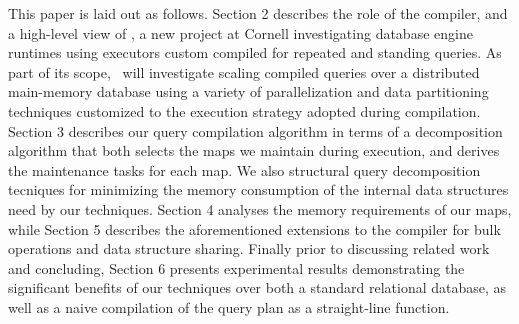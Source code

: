 This paper is laid out as follows. Section 2 describes the role of the compiler,
and a high-level view of \compiler, a new project at Cornell investigating
database engine runtimes using executors custom compiled for repeated and
standing queries. As part of its scope, \compiler\ will investigate scaling
compiled queries over a distributed main-memory database using a variety of
parallelization and data partitioning techniques customized to the execution
strategy adopted during compilation. Section 3 describes our query compilation
algorithm in terms of a decomposition algorithm that both selects the maps we
maintain during execution, and derives the maintenance tasks for each map. We
also structural query decomposition tecniques for minimizing the memory
consumption of the internal data structures need by our techniques.
Section 4 analyses the memory
requirements of our maps, while Section 5 describes the aforementioned extensions
to the compiler for bulk operations and data structure sharing. Finally prior to
discussing related work and concluding, Section 6 presents experimental results
demonstrating the significant benefits of our techniques over both a standard
relational database, as well as a naive compilation of the query plan as a
straight-line function.






